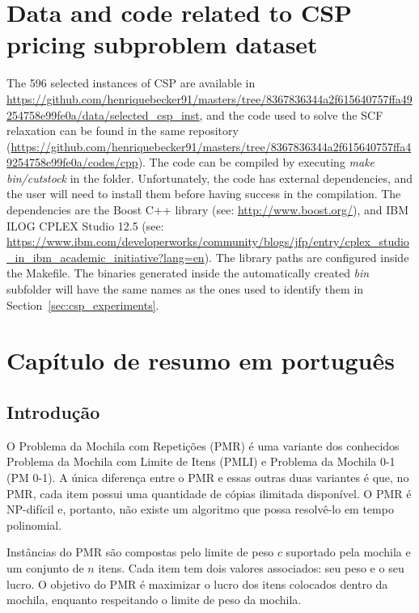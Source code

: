 \section{Data and code related to CSP pricing subproblem dataset}
\label{sec:csp_appendix}
The 596 selected instances of CSP are available in \url{https://github.com/henriquebecker91/masters/tree/8367836344a2f615640757ffa49254758e99fe0a/data/selected_csp_inst}, and the code used to solve the SCF relaxation can be found in the same repository (\url{https://github.com/henriquebecker91/masters/tree/8367836344a2f615640757ffa49254758e99fe0a/codes/cpp}).
The code can be compiled by executing \emph{make bin/cutstock} in the folder.
Unfortunately, the code has external dependencies, and the user will need to install them before having success in the compilation.
The dependencies are the Boost C++ library (see: \url{http://www.boost.org/}), and IBM ILOG CPLEX Studio 12.5 (see: \url{https://www.ibm.com/developerworks/community/blogs/jfp/entry/cplex_studio_in_ibm_academic_initiative?lang=en}).
The library paths are configured inside the Makefile.
The binaries generated inside the automatically created \emph{bin} subfolder will have the same names as the ones used to identify them in Section~\ref{sec:csp_experiments}.

\section{Capítulo de resumo em português}

\subsection{Introdução}

O Problema da Mochila com Repetições (PMR) é uma variante dos conhecidos Problema da Mochila com Limite de Itens (PMLI) e Problema da Mochila 0-1 (PM 0-1).
A única diferença entre o PMR e essas outras duas variantes é que, no PMR, cada item possui uma quantidade de cópias ilimitada disponível.
O PMR é NP-difícil e, portanto, não existe um algoritmo que possa resolvê-lo em tempo polinomial.

Instâncias do PMR são compostas pelo limite de peso \(c\) suportado pela mochila e um conjunto de \(n\) itens.
Cada item tem dois valores associados: seu peso e o seu lucro.
O objetivo do PMR é maximizar o lucro dos itens colocados dentro da mochila, enquanto respeitando o limite de peso da mochila.

